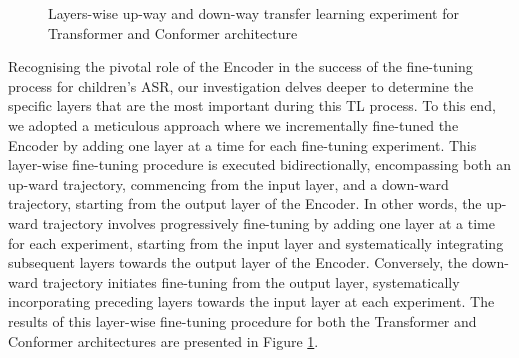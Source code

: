 \begin{figure}
    \centering
    \caption{Layers-wise up-way and down-way transfer learning experiment for Transformer and Conformer architecture}
    \label{fig:layerWISE}
\end{figure}

Recognising the pivotal role of the Encoder in the success of the fine-tuning process for children's \ac{ASR}, our investigation delves deeper to determine the specific layers that are the most important during this \ac{TL} process. To this end, we adopted a meticulous approach where we incrementally fine-tuned the Encoder by adding one layer at a time for each fine-tuning experiment. This layer-wise fine-tuning procedure is executed bidirectionally, encompassing both an up-ward trajectory, commencing from the input layer, and a down-ward trajectory, starting from the output layer of the Encoder. In other words, the up-ward trajectory involves progressively fine-tuning by adding one layer at a time for each experiment, starting from the input layer and systematically integrating subsequent layers towards the output layer of the Encoder. Conversely, the down-ward trajectory initiates fine-tuning from the output layer, systematically incorporating preceding layers towards the input layer at each experiment. The results of this layer-wise fine-tuning procedure for both the Transformer and Conformer architectures are presented in Figure \ref{fig:layerWISE}.

